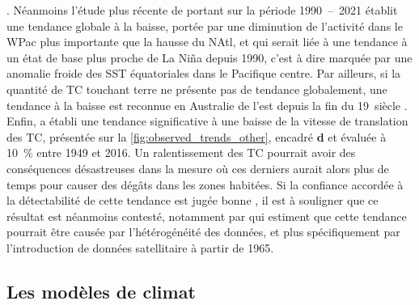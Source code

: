 \documentclass[../main.tex]{subfiles}
\begin{document}
\parencite{webster_changes_2005,maue_recent_2011,wang_climate_2010,seneviratne_weather_2021}. Néanmoins l'étude plus récente de \cite{klotzbach_trends_2022}
portant sur la période \num{1990}~--~\num{2021} établit une tendance globale à la baisse, portée par une diminution de l'activité dans le WPac plus importante
que la hausse du NAtl, et qui serait liée à une tendance à un état de base plus proche de La Niña depuis \num{1990}, c'est à dire marquée par une anomalie
froide des SST équatoriales dans le Pacifique centre. Par ailleurs, si la quantité de TC touchant terre ne présente pas de tendance globalement, une tendance à
la baisse est reconnue en Australie de l'est depuis la fin du \num{19}\ieme~siècle \parencite{knutson_tropical_2019,callaghan_variability_2011}. Enfin,
\cite{kossin_global_2018,kossin_reply_2019} a établi une tendance significative à une baisse de la vitesse de translation des TC, présentée sur la
\cref{fig:observed_trends_other}, encadré \textbf{d} et évaluée à \SI{10}{\percent} entre \num{1949} et \num{2016}. Un ralentissement des TC pourrait avoir des
conséquences désastreuses dans la mesure où ces derniers aurait alors plus de temps pour causer des dégâts dans les zones habitées. Si la confiance accordée à
la détectabilité de cette tendance est jugée bonne \parencite{knutson_tropical_2019,seneviratne_weather_2021}, il est à souligner que ce résultat est néanmoins
contesté, notamment par \cite{lanzante_uncertainties_2019,moon_climate_2019} qui estiment que cette tendance pourrait être causée par l'hétérogénéité des
données, et plus spécifiquement par l'introduction de données satellitaire à partir de \num{1965}.

\subsection{Les modèles de climat}
\end{document}
